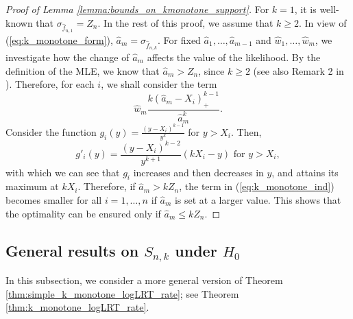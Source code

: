\documentclass[12pt,letterpaper, twoside, openany]{article}
\theoremstyle{plain}
\begin{document}
\begin{proof}[Proof of Lemma \ref{lemma:bounds_on_kmonotone_support}]
For $k=1$, it is well-known that $\sigma_{\hat{f}_{n,1}} = Z_n$. In the rest of this proof, we assume that $k\geq2$. In view of (\ref{eq:k_monotone_form}), $\hat{a}_m  = \sigma_{\hat{f}_{n,k}}$.
For fixed $\hat{a}_1,\ldots,\hat{a}_{m-1}$ and $\hat{w}_1,\ldots,\hat{w}_m$, we investigate how the change of $\hat{a}_m$ affects the value of the likelihood. By the definition of the MLE, we know that  $\hat{a}_m > Z_n$, since $k \geq2$ (see also Remark 2 in \cite{balabdaoui2010estimation}). Therefore, for each $i$, we shall consider the term
\begin{equation}\label{eq:k_monotone_ind}
	\hat{w}_m \frac{k (\hat{a}_m - X_i)^{k-1}_+}{\hat{a}^k_m}.
\end{equation}
Consider the function $g_i(y) = \frac{ (y- X_i)^{k-1}}{y^k}$ for $y > X_i$. Then,
\begin{equation*}
	g'_i(y) = \frac{(y- X_i)^{k-2}}{y^{k+1}}(k X_i - y) \text{ for } y > X_i,
\end{equation*} 
with which we can see that $g_i$ increases and then decreases in $y$, and attains its maximum at $k X_i$. Therefore, if $\hat{a}_m > k Z_n$, the term in (\ref{eq:k_monotone_ind}) becomes smaller for all $i=1,\ldots,n$ if $\hat{a}_m$ is set at a larger value. This shows that the optimality can be ensured only if $\hat{a}_m \leq k Z_n$.
\end{proof}


\subsection{General results on $S_{n,k}$ under $H_0$}\label{subsect:general_k_monotone_results}
In this subsection, we consider a more general version of Theorem \ref{thm:simple_k_monotone_logLRT_rate}; see Theorem \ref{thm:k_monotone_logLRT_rate}. 
\end{document}
